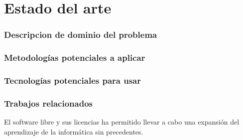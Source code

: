 \chapter{Estado del arte}
\subsection{Descripcion de dominio del problema}

\subsection{Metodologías potenciales a aplicar}
\subsection{Tecnologías potenciales para usar}
\subsection{Trabajos relacionados}
El software libre y sus licencias \cite{gplv3} ha permitido llevar a cabo una expansión del
aprendizaje de la informática sin precedentes.
